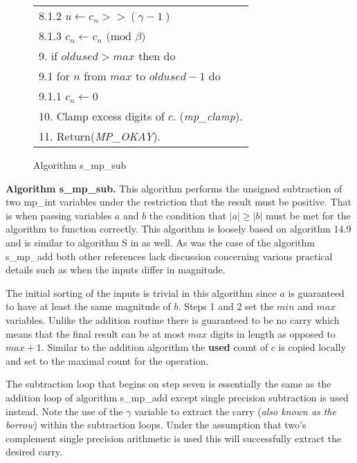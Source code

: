 \documentclass[b5paper]{book}
\begin{document}
\begin{figure}[!here]
\begin{center}
\begin{small}
\begin{tabular}{l}
\hspace{6mm}8.1.2  $u   \leftarrow c_n >> (\gamma - 1)$ \\
\hspace{6mm}8.1.3  $c_n \leftarrow c_n \mbox{ (mod }\beta\mbox{)}$ \\
9. if $oldused > max$ then do \\
\hspace{3mm}9.1  for $n$ from $max$ to $oldused - 1$ do \\
\hspace{6mm}9.1.1  $c_n \leftarrow 0$ \\
10. Clamp excess digits of $c$.  (\textit{mp\_clamp}). \\
11. Return(\textit{MP\_OKAY}). \\
\hline
\end{tabular}
\end{small}
\end{center}
\caption{Algorithm s\_mp\_sub}
\end{figure}

\textbf{Algorithm s\_mp\_sub.}
This algorithm performs the unsigned subtraction of two mp\_int variables under the restriction that the result must be positive.  That is when
passing variables $a$ and $b$ the condition that $\vert a \vert \ge \vert b \vert$ must be met for the algorithm to function correctly.  This
algorithm is loosely based on algorithm 14.9 \cite[pp. 595]{HAC} and is similar to algorithm S in \cite[pp. 267]{TAOCPV2} as well.  As was the case
of the algorithm s\_mp\_add both other references lack discussion concerning various practical details such as when the inputs differ in magnitude.

The initial sorting of the inputs is trivial in this algorithm since $a$ is guaranteed to have at least the same magnitude of $b$.  Steps 1 and 2 
set the $min$ and $max$ variables.  Unlike the addition routine there is guaranteed to be no carry which means that the final result can be at 
most $max$ digits in length as opposed to $max + 1$.  Similar to the addition algorithm the \textbf{used} count of $c$ is copied locally and 
set to the maximal count for the operation.

The subtraction loop that begins on step seven is essentially the same as the addition loop of algorithm s\_mp\_add except single precision 
subtraction is used instead.  Note the use of the $\gamma$ variable to extract the carry (\textit{also known as the borrow}) within the subtraction 
loops.  Under the assumption that two's complement single precision arithmetic is used this will successfully extract the desired carry.  
\end{document}
